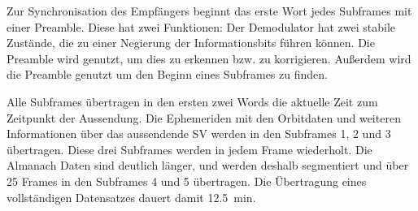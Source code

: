 
Zur Synchronisation des Empfängers beginnt das erste Wort jedes Subframes mit einer Preamble. Diese hat zwei Funktionen: Der Demodulator hat zwei stabile Zustände, die zu einer Negierung der Informationsbits führen können. Die Preamble wird genutzt, um dies zu erkennen bzw. zu korrigieren. Außerdem wird die Preamble genutzt um den Beginn eines Subframes zu finden.

Alle Subframes übertragen in den ersten zwei Words die aktuelle Zeit zum Zeitpunkt der Aussendung. Die Ephemeriden mit den Orbitdaten und weiteren Informationen über das aussendende \gls{SV} werden in den Subframes 1, 2 und 3 übertragen. Diese drei Subframes werden in jedem Frame wiederholt. Die Almanach Daten sind deutlich länger, und werden deshalb segmentiert und über 25 Frames in den Subframes 4 und 5 übertragen. Die Übertragung eines vollständigen Datensatzes dauert damit \SI{12.5}{\minute}.

